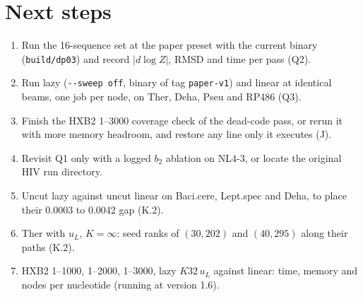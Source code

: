 \documentclass[11pt]{article}
\begin{document}
\section{Next steps}
\begin{enumerate}[leftmargin=*]
  \item Run the 16-sequence set at the paper preset with the current binary (\texttt{build/dp03}) and record $|d\log Z|$, RMSD and time per pass (Q2).
  \item Run lazy (\texttt{-{}-sweep off}, binary of tag \texttt{paper-v1}) and linear at identical beams, one job per node, on Ther, Deha, Pseu and RP486 (Q3).
  \item Finish the HXB2 1--3000 coverage check of the dead-code pass, or rerun it with more memory headroom, and restore any line only it executes (J).
  \item Revisit Q1 only with a logged $b_2$ ablation on NL4-3, or locate the original HIV run directory.
  \item Uncut lazy against uncut linear on Baci.cere, Lept.spec and Deha, to place their 0.0003 to 0.0042 gap (K.2).
  \item Ther with $u_L$, $K=\infty$: seed ranks of $(30,202)$ and $(40,295)$ along their paths (K.2).
  \item HXB2 1--1000, 1--2000, 1--3000, lazy $K32\,u_L$ against linear: time, memory and nodes per nucleotide (running at version 1.6).
\end{enumerate}
\end{document}
